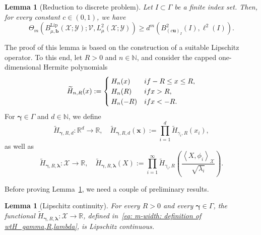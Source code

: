 \documentclass[namedate,webpdf]{ima-authoring-template-blank}
\newcommand*{\Lip}{\mathrm{Lip}}  %
\newcommand*{\ip}[2]{\left\langle #1, #2 \right\rangle}
\newcounter{counter}
\numberwithin{counter}{section}
\numberwithin{equation}{section}
\theoremstyle{plain}
\newtheorem{lemma}[counter]{Lemma}
\theoremstyle{definition}
\newcommand*{\cV}{\mathcal{V}}
\newcommand*{\cX}{\mathcal{X}}
\newcommand*{\cY}{\mathcal{Y}}
\newcommand*{\bbN}{\mathbb{N}}
\newcommand*{\bbR}{\mathbb{R}}
\newcommand*{\wtH}{\widetilde{H}}
\theoremstyle{thmstyletwo}
\begin{document}
\begin{lemma}[Reduction to discrete problem]
\label{lem: m-width: discrete problem}
    Let \(I\subset\Gamma\) be a finite index set. Then, for every constant \(c \in (0,1)\), we have
    \[
    \Theta_m(B_{\mu, \bm{b}}^{\Lip}(\cX; \cY); \cV, L_{\mu}^2(\cX; \cY)) \geq d^m(B_{(c\bm{u})_I}^2(I), \ell^2(I)).
    \]
\end{lemma}

The proof of this lemma is based on the construction of a suitable Lipschitz operator. To this end, let \(R > 0\) and \(n \in \bbN\), and consider the capped one-dimensional Hermite polynomials
\begin{equation}
\label{eq: m-width: definition wtH_n,R}
    \wtH_{n,R}(x) := 
    \begin{cases}
        H_n(x) & \textup{ if } -R \leq x \leq R, \\
        H_n(R) & \textup{ if } x > R, \\
        H_n(-R) & \textup{ if } x < -R.
    \end{cases}
\end{equation}
For \(\bm{\gamma}\in\Gamma\) and \(d \in \bbN\), we define
\begin{equation}
\label{eq: m-width: definition of wtH_gamma,R,d}
    \wtH_{\bm{\gamma}, R, d}: \bbR^d \to \bbR, \quad 
    \wtH_{\bm{\gamma}, R, d}(\bm{x}) := \prod_{i=1}^d \wtH_{\gamma_i, R} (x_i),
\end{equation}
as well as 
\begin{equation}
\label{eq: m-width: definition of wtH_gamma,R,lambda}
    \wtH_{\bm{\gamma}, R, \bm{\lambda}}: \cX \to \bbR, \quad 
    \wtH_{\bm{\gamma}, R, \bm{\lambda}}(X)
    := \prod_{i = 1}^{\infty} \wtH_{\gamma_i, R} \left(\frac{\ip{X}{\phi_i}_{\cX}}{\sqrt{\lambda_i}}\right).
\end{equation}

Before proving Lemma~\ref{lem: m-width: discrete problem}, we need a couple of preliminary results.

\begin{lemma}[Lipschitz continuity]
\label{lem: Lipschitz continuity of capped Hermite polynomials}
    For every \(R > 0\) and every \(\bm{\gamma} \in \Gamma\), the functional \(\wtH_{\bm{\gamma}, R, \bm{\lambda}} : \cX \to \bbR\), defined in~\eqref{eq: m-width: definition of wtH_gamma,R,lambda}, is Lipschitz continuous.
\end{lemma}
\end{document}
